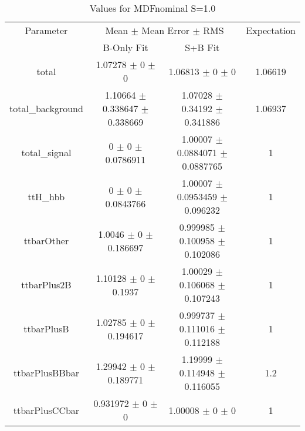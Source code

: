 \begin{table}
\centering
\caption{Values for MDFnominal S=1.0}
\begin{tabular}{cccc}
\toprule
Parameter & \multicolumn{2}{c}{Mean $\pm$ Mean Error $\pm$ RMS} & Expectation\\
 & B-Only Fit & S+B Fit & \\
\midrule
total & \num{1.07278} $\pm$ \num{0} $\pm$ \num{0} & \num{1.06813} $\pm$ \num{0} $\pm$ \num{0} & \num{1.06619}\\
total\_background & \num{1.10664} $\pm$ \num{0.338647} $\pm$ \num{0.338669} & \num{1.07028} $\pm$ \num{0.34192} $\pm$ \num{0.341886} & \num{1.06937}\\
total\_signal & \num{0} $\pm$ \num{0} $\pm$ \num{0.0786911} & \num{1.00007} $\pm$ \num{0.0884071} $\pm$ \num{0.0887765} & \num{1}\\
ttH\_hbb & \num{0} $\pm$ \num{0} $\pm$ \num{0.0843766} & \num{1.00007} $\pm$ \num{0.0953459} $\pm$ \num{0.096232} & \num{1}\\
ttbarOther & \num{1.0046} $\pm$ \num{0} $\pm$ \num{0.186697} & \num{0.999985} $\pm$ \num{0.100958} $\pm$ \num{0.102086} & \num{1}\\
ttbarPlus2B & \num{1.10128} $\pm$ \num{0} $\pm$ \num{0.1937} & \num{1.00029} $\pm$ \num{0.106068} $\pm$ \num{0.107243} & \num{1}\\
ttbarPlusB & \num{1.02785} $\pm$ \num{0} $\pm$ \num{0.194617} & \num{0.999737} $\pm$ \num{0.111016} $\pm$ \num{0.112188} & \num{1}\\
ttbarPlusBBbar & \num{1.29942} $\pm$ \num{0} $\pm$ \num{0.189771} & \num{1.19999} $\pm$ \num{0.114948} $\pm$ \num{0.116055} & \num{1.2}\\
ttbarPlusCCbar & \num{0.931972} $\pm$ \num{0} $\pm$ \num{0} & \num{1.00008} $\pm$ \num{0} $\pm$ \num{0} & \num{1}\\
\bottomrule
\end{tabular}
\end{table}